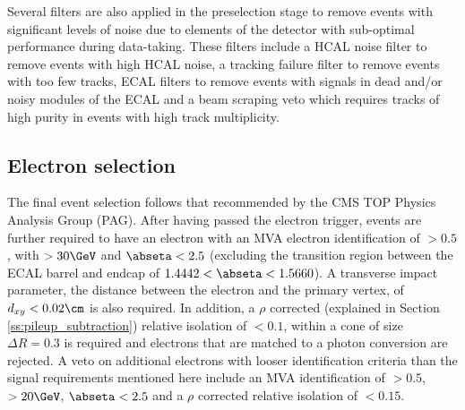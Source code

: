 

Several filters are also applied in the preselection stage to remove events with significant levels of noise
due to elements of the detector with sub-optimal performance during data-taking. These filters include a HCAL
noise filter to remove events with high HCAL noise, a tracking failure filter to remove events with too few
tracks, ECAL filters to remove events with signals in dead and/or noisy modules of the ECAL and a beam
scraping veto which requires tracks of high purity in events with high track multiplicity.


\subsection{Electron selection}
\label{electronplusjetschannelselection}
The final event selection follows that recommended by the CMS TOP Physics Analysis Group (PAG). After having
passed the electron trigger, events are further required to have an electron with an MVA electron
identification of $>0.5$, with \Et $> 30\GeV$ and $\abseta < 2.5$ (excluding the transition region between
the ECAL barrel and endcap of $1.4442 < \abseta < 1.5660$). A transverse impact parameter, the distance
between the electron and the primary vertex, of $d_{xy} < 0.02\cm$ is also required. In addition, a $\rho$
corrected (explained in Section \ref{ss:pileup_subtraction}) relative isolation of $< 0.1$, within a cone of size
$\Delta R = 0.3$ is required and electrons that are matched to a photon conversion are rejected. 
A veto on additional electrons with looser identification criteria than the signal requirements mentioned here
include an MVA identification of $> 0.5$, \Et $> 20\GeV$, $\abseta < 2.5$ and a $\rho$ corrected relative
isolation of $<0.15$.

